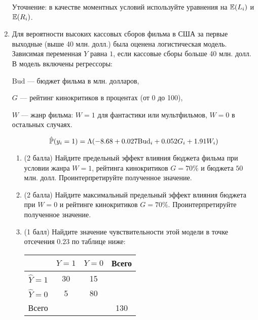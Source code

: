 \begin{enumerate}
\begin{enumerate}
    \end{enumerate}

    Уточнение: в качестве моментных условий используйте уравнения на $\E(L_i)$ и $\E(R_i)$.

    \item 
Для вероятности высоких кассовых сборов фильма в США за первые выходные (выше 40 млн. долл.) была оценена логистическая модель. Зависимая переменная  $Y$ равна $1$, если кассовые сборы больше 40 млн. долл. В модель включены регрессоры: 

$\text{Bud}$ — бюджет фильма в млн. долларов, 

$G$ — рейтинг кинокритиков в процентах (от 0 до 100), 

$W$ — жанр фильма: $W=1$ для фантастики или мультфильмов, $W=0$ в остальных случаях.

\[
\hat \P(y_i = 1) = \Lambda(-8.68 + 0.027 \text{Bud}_i + 0.052 G_i + 1.91 W_i)    
\]

\begin{enumerate}
\item (2 балла) Найдите предельный  эффект влияния бюджета фильма при условии жанра $W=1$, рейтинга кинокритиков $G = 70\%$ и бюджета $50$ млн. долл. Проинтерпретируйте полученное значение. 

\item (2 балла) Найдите максимальный предельный эффект влияния бюджета при $W=0$ и рейтинге кинокритиков $G=70\%$. Проинтерпретируйте полученное значение. 

\item (1 балл) Найдите значение чувствительности этой модели в точке отсечения $0.23$ по таблице ниже:

\begin{tabular}{@{}cccc@{}}
\toprule
           & $Y=1$ & $Y=0$ & Всего\\ \midrule
$\hat Y=1$ & 30 & 15 &  \\
$\hat Y=0$ & 5 & 80 &  \\
Всего &  &  & 130   \\ \bottomrule
\end{tabular}


\end{enumerate}
\end{enumerate}
